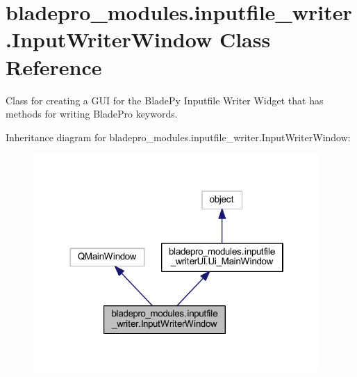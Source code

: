 \hypertarget{a00073}{}\section{bladepro\+\_\+modules.\+inputfile\+\_\+writer.\+Input\+Writer\+Window Class Reference}
\label{a00073}


Class for creating a G\+UI for the Blade\+Py Inputfile Writer Widget that has methods for writing Blade\+Pro keywords.  




Inheritance diagram for bladepro\+\_\+modules.\+inputfile\+\_\+writer.\+Input\+Writer\+Window\+:
\nopagebreak
\begin{figure}[H]
\begin{center}
\leavevmode
\includegraphics[width=310pt]{a00072}
\end{center}
\end{figure}
